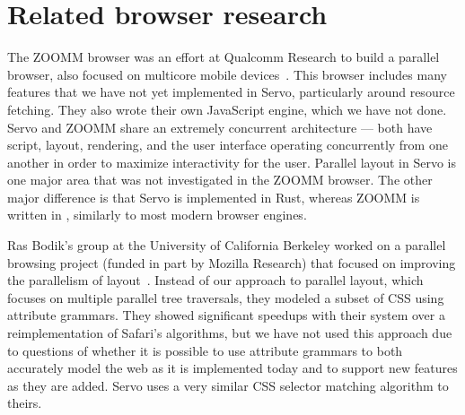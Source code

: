 %
\section{Related browser research}
\label{sec:rel}
The ZOOMM browser was an effort at Qualcomm Research to build a parallel browser, also
focused on multicore mobile devices~\cite{ZOOMM}.
This browser includes many features that we have not yet implemented in Servo, particularly
around resource fetching.
They also wrote their own JavaScript engine, which we have not done.
Servo and ZOOMM share an extremely concurrent architecture --- both have script, layout,
rendering, and the user interface operating concurrently from one another in order to maximize
interactivity for the user.
Parallel layout in Servo is one major area that was not investigated in the ZOOMM browser.
The other major difference is that Servo is implemented in Rust, whereas ZOOMM is written
in \Cplusplus, similarly to most modern browser engines.

Ras Bodik's group at the University of California Berkeley worked on a parallel browsing
project (funded in part by Mozilla Research) that focused on improving the parallelism
of layout~\cite{parallel-layout}.
Instead of our approach to parallel layout, which focuses on multiple parallel tree
traversals, they modeled a subset of CSS using attribute grammars.
They showed significant speedups with their system over a reimplementation of Safari's
algorithms, but we have not used this approach due to questions of whether it is possible
to use attribute grammars to both accurately model the web as it is implemented today
and to support new features as they are added.
Servo uses a very similar CSS selector matching algorithm to theirs.
